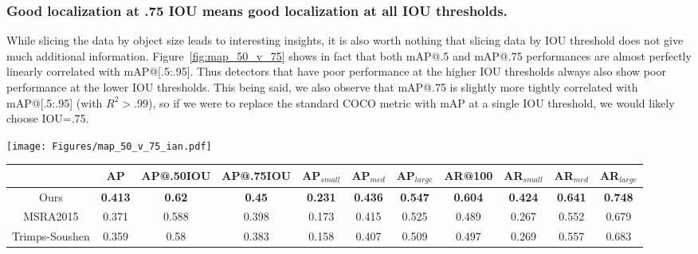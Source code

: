 \documentclass[10pt,twocolumn,letterpaper]{article}
\renewcommand{\paragraph}[1]{\subsubsection{#1}}
\begin{document}
\paragraph{Good localization at .75 IOU means good localization at all IOU thresholds.}

While slicing the data by object size leads to interesting insights,
it is also worth nothing that slicing data by IOU threshold does not
give much additional information.  Figure~\ref{fig:map_50_v_75} shows
in fact that both  mAP@.5 and mAP@.75 performances are almost
perfectly linearly correlated with mAP@[.5:.95].  Thus detectors that
have poor performance at the higher IOU thresholds always also show
poor performance at the lower IOU thresholds. 
This being said, we also observe that mAP@.75 is slightly more tightly
correlated with mAP@[.5:.95] (with $R^2>.99$), so if we were to
replace the standard COCO metric with mAP at a single IOU threshold,
we would likely choose IOU=.75. 


\begin{figure*}
\begin{center}
\texttt{[image: Figures/map\_50\_v\_75\_ian.pdf]}
\end{center}\vspace{-4mm}
\caption{
\footnotesize Overall COCO mAP (@[.5:.95]) for all experiments plotted against
corresponding mAP@.50IOU and mAP@.75IOU.  It is unsurprising that these numbers
are correlated, but it is interesting that they are almost perfectly correlated so for these models, it is never the case that a model has strong 
performance at 50\% IOU but weak performance at 75\% IOU.
}
\label{fig:map_50_v_75}
\end{figure*}









\begin{table*}[t!]
\begin{center}
{\footnotesize
\begin{tabular}{c|c|c|c|c|c|c|c|c|c|c}
\, & AP & AP@.50IOU & AP@.75IOU & AP$_{small}$ & AP$_{med}$ & AP$_{large}$ & AR@100 & AR$_{small}$ & AR$_{med}$ & AR$_{large}$ \\
\hline
Ours & \bf 0.413 & \bf 0.62 & \bf 0.45 & \bf 0.231 & \bf 0.436 & \bf 0.547 & \bf 0.604 & \bf 0.424 & \bf 0.641 & \bf 0.748 \\
MSRA2015 & 0.371 & 0.588 & 0.398 & 0.173 & 0.415 & 0.525 & 0.489 & 0.267 & 0.552 & 0.679 \\
Trimps-Soushen & 0.359 & 0.58 & 0.383 & 0.158 & 0.407 & 0.509 & 0.497 & 0.269 & 0.557 & 0.683 \\
\end{tabular}\vspace{-4mm}
}
\end{center}
\caption{
\footnotesize Performance on the  2016 COCO test-challenge dataset.
AP and AR refer to (mean) average precision and average recall respectively.
Our model achieves a relative improvement of nearly 60\% on small objects recall over the previous state-of-the-art COCO detector.
}
\label{tab:cocoresults}
\end{table*}
\end{document}
